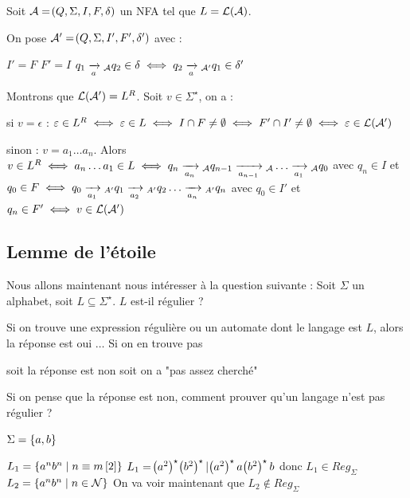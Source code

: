 \documentclass[a4paper,french,bookmarks]{book}
\begin{document}
    \begin{nproof}
        Soit $\mathcal{A} = \!\left(Q, \Sigma, I, F, \delta\right)$ un NFA tel que $L = \mathcal{L}\!\left(\mathcal{A}\right)$.
        
        On pose $\mathcal{A}' = \!\left(Q, \Sigma, I', F', \delta'\right)$ avec :
        \begin{enumerate}
            \itt $I' = F$
            \itt $F' = I$
            \itt $q_1 \lima{a}{}_\bcA q_2 \in \delta \iff q_2 \lima{a}{}_{\bcA'} q_1 \in \delta'$
        \end{enumerate}
        Montrons que $\mathcal{L}\!\left(\mathcal{A}'\right) = L^R$. Soit $v \in \Sigma^\star$, on a :
        \begin{enumerate}
            \itt si $v = \epsilon$ : $\varepsilon \in L^R \iff \varepsilon \in L \iff I \cap F \neq \emptyset \iff F' \cap I' \neq \emptyset \iff \varepsilon \in \mathcal{L}\!\left(\mathcal{A}'\right)$
            
            \itt sinon : $v = a_1 \dots a_n$.
            Alors $v \in L^R \iff a_n \dots a_1 \in L \iff q_n \lima{a_{n}}{}_\bcA q_{n-1} \lima{a_{n-1}}{}_\bcA \dots \lima{a_1}{}_\bcA q_0$ avec $q_n \in I$ et $q_0 \in F \iff q_0 \lima{a_1}{}_{A'} q_1 \lima{a_2}{}_{A'} q_2 \dots \lima{a_n}{}_{A'} q_n$ avec $q_0 \in I'$ et $q_n \in F' \iff v \in \mathcal{L}\!\left(\mathcal{A}'\right)$
        \end{enumerate}
    \end{nproof}
    
    \subsection{Lemme de l'étoile}
    
    Nous allons maintenant nous intéresser à la question suivante :
    Soit $\Sigma$ un alphabet, soit $L \subseteq \Sigma^\star$. $L$ est-il régulier ?
    \begin{enumerate}
        \itt Si on trouve une expression régulière ou un automate dont le langage est $L$, alors la réponse est oui $\dots$
        \itt Si on en trouve pas
        \begin{enumerate}
            \itt soit la réponse est non
            \itt soit on a "pas assez cherché"
        \end{enumerate}
    \end{enumerate}
    Si on pense que la réponse est non, comment prouver qu'un langage n'est pas régulier ?
    
    \begin{example}{}{}
        $\Sigma = \left\{a, b\right\}$
        \begin{enumerate}
            \itt $L_1 = \left\{a^n b^n\;\middle\vert\; n \equiv m \left[2\right]\right\}$
            $L_1 = \!\left(a^2\right)^\star \!\left(b^2\right)^\star \vert \!\left(a^2\right)^\star a \!\left(b^2\right)^\star b$
            donc $L_1 \in Reg_\Sigma$
            \itt $L_2 = \left\{a^n b^n \;\middle\vert\; n \in \mathcal{N}\right\}$
            On va voir maintenant que $L_2 \notin Reg_\Sigma$
        \end{enumerate}
    \end{example}
    
\end{document}
